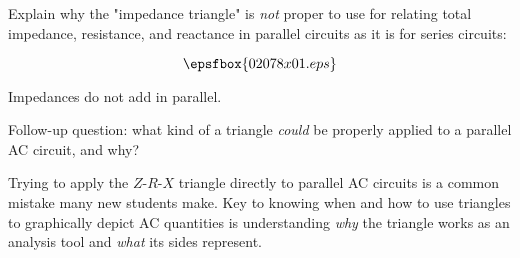 

Explain why the "impedance triangle" is {\it not} proper to use for relating total impedance, resistance, and reactance in parallel circuits as it is for series circuits:

$$\epsfbox{02078x01.eps}$$







Impedances do not add in parallel.

\vskip 10pt

Follow-up question: what kind of a triangle {\it could} be properly applied to a parallel AC circuit, and why?







Trying to apply the $Z$-$R$-$X$ triangle directly to parallel AC circuits is a common mistake many new students make.  Key to knowing when and how to use triangles to graphically depict AC quantities is understanding {\it why} the triangle works as an analysis tool and {\it what} its sides represent.




